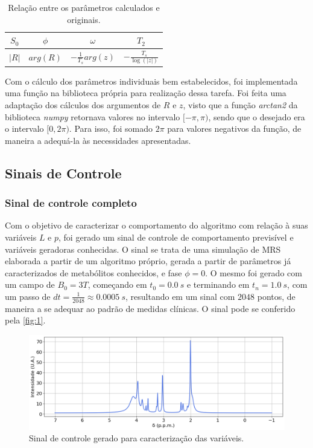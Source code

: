 \documentclass[12pt]{article}
\begin{document}
\begin{table}[H]
    \centering
    \begin{tabular}{|c|c|c|c|}
        \hline
        $S_0$ & $\phi$ & $\omega$ & $T_2$ \\ 
        \hline
        $|R|$ & $arg(R)$ & $-\frac{1}{T_s} arg(z)$ & $-\frac{T_s}{\log(|z|)}$ \\
        \hline
    \end{tabular}
    \caption{Relação entre os parâmetros calculados e originais.}
    \label{tab:1}
\end{table}

Com o cálculo dos parâmetros individuais bem estabelecidos, foi implementada uma função na biblioteca própria para realização dessa tarefa. Foi feita uma 
adaptação dos cálculos dos argumentos de $R$ e $z$, visto que a função \textit{arctan2} da biblioteca \textit{numpy} retornava valores no intervalo $[-\pi, \pi)$, 
sendo que o desejado era o intervalo $[0, 2\pi)$. Para isso, foi somado $2\pi$ para valores negativos da função, de maneira a adequá-la às necessidades apresentadas. 

\subsection{Sinais de Controle}

\subsubsection{Sinal de controle completo} \label{sec:sinal-completo}

Com o objetivo de caracterizar o comportamento do algoritmo com relação à suas variáveis $L$ e $p$, foi gerado um sinal de controle 
de comportamento previsível e variáveis geradoras conhecidas. O sinal se trata de uma simulação de MRS elaborada a partir de um algoritmo 
próprio, gerada a partir de parâmetros já caracterizados de metabólitos conhecidos, e fase $\phi = 0$. O mesmo foi gerado com um campo de $B_0 = 3T$, começando em 
$t_0 = 0.0 \ s$ e terminando em $t_n = 1.0 \ s$, com um passo de $dt = \frac{1}{2048} \approx 0.0005 \ s$, resultando em um sinal com $2048$ pontos, de maneira 
a se adequar ao padrão de medidas clínicas. O sinal pode se conferido pela \autoref{fig:1}.

\begin{figure} [H]
    \includegraphics[scale=0.5]{sinal-de-controle.png}
    \centering
    \caption{Sinal de controle gerado para caracterização das variáveis.}
    \label{fig:1}
\end{figure}
\end{document}
